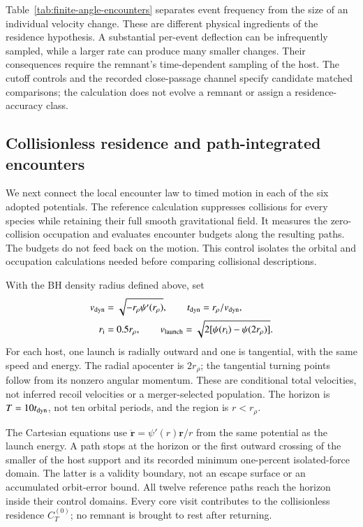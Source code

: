 \documentclass[aps,prd,reprint,amsmath,amssymb,superscriptaddress,nofootinbib,longbibliography,floatfix]{revtex4-2}
\begin{document}
Table~\ref{tab:finite-angle-encounters} separates event frequency from the size of an individual velocity change. These are different physical ingredients of the residence hypothesis. A substantial per-event deflection can be infrequently sampled, while a larger rate can produce many smaller changes. Their consequences require the remnant's time-dependent sampling of the host. The cutoff controls and the recorded close-passage channel specify candidate matched comparisons; the calculation does not evolve a remnant or assign a residence-accuracy class.

\subsection{Collisionless residence and path-integrated encounters}\label{sec:collisionless-residence}

We next connect the local encounter law to timed motion in each of the six adopted potentials. The reference calculation suppresses collisions for every species while retaining their full smooth gravitational field. It measures the zero-collision occupation and evaluates encounter budgets along the resulting paths. The budgets do not feed back on the motion. This control isolates the orbital and occupation calculations needed before comparing collisional descriptions.

With the BH density radius defined above, set
\begin{align}
v_{\rm dyn}&=\sqrt{-r_\rho\psi'(r_\rho)},\qquad
t_{\rm dyn}=r_\rho/v_{\rm dyn},\nonumber\\
r_{\rm i}&=0.5r_\rho,\qquad
v_{\rm launch}=\sqrt{2[\psi(r_{\rm i})-\psi(2r_\rho)]}.
\label{eq:collisionless-launch}
\end{align}
For each host, one launch is radially outward and one is tangential, with the same speed and energy. The radial apocenter is $2r_\rho$; the tangential turning points follow from its nonzero angular momentum. These are conditional total velocities, not inferred recoil velocities or a merger-selected population. The horizon is $T=10t_{\rm dyn}$, not ten orbital periods, and the region is $r<r_\rho$.

The Cartesian equations use $\ddot{\mathbf r}=\psi'(r)\mathbf r/r$ from the same potential as the launch energy. A path stops at the horizon or the first outward crossing of the smaller of the host support and its recorded minimum one-percent isolated-force domain. The latter is a validity boundary, not an escape surface or an accumulated orbit-error bound. All twelve reference paths reach the horizon inside their control domains. Every core visit contributes to the collisionless residence $C_T^{(0)}$; no remnant is brought to rest after returning.
\end{document}
